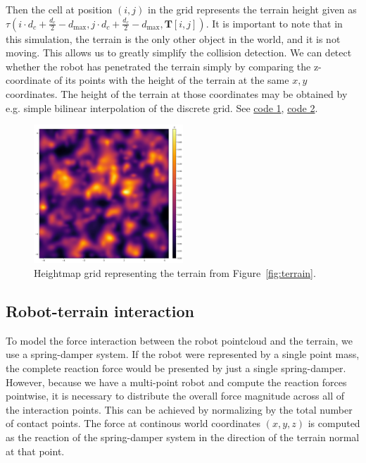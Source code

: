\documentclass[a4paper,12pt]{article}
\begin{document}
Then the cell at position $(i,j)$ in the grid represents the terrain height given as $\tau(i \cdot d_c + \frac{d_c}{2} - d_{\text{max}}, j \cdot d_c + \frac{d_c}{2} - d_{\text{max}}, \mathbf{T}\left[i,j\right])$. It is important to note that in this simulation, the terrain is the only other object in the world, and it is not moving. This allows us to greatly simplify the collision detection. We can detect whether the robot has penetrated the terrain simply by comparing the z-coordinate of its points with the height of the terrain at the same $x,y$ coordinates. The height of the terrain at those coordinates may be obtained by e.g. simple bilinear interpolation of the discrete grid. See \href{https://github.com/edavidk7/tracked_sim_rl/blob/main/configs/terrain_config.py}{code 1}, \href{https://github.com/edavidk7/tracked_sim_rl/blob/main/utils/environment.py}{code 2}. 

\begin{figure}[H]
  \centering
  \includegraphics[width=0.5\textwidth]{fig/terrain_grid.png}
  \caption{Heightmap grid representing the terrain from Figure~\ref{fig:terrain}.}
  \label{fig:terrain_grid}
\end{figure}

\subsection{Robot-terrain interaction}
\label{sec:interaction}

To model the force interaction between the robot pointcloud and the terrain, we use a spring-damper system. If the robot were represented by a single point mass, the complete reaction force would be presented by just a single spring-damper. However, because we have a multi-point robot and compute the reaction forces pointwise, it is necessary to distribute the overall force magnitude across all of the interaction points. This can be achieved by normalizing by the total number of contact points. The force at continous world coordinates $(x,y,z)$ is computed as the reaction of the spring-damper system in the direction of the terrain normal at that point. 
\end{document}
